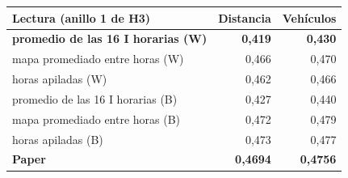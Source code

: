 \begin{tabular}{lrr}\toprule
Lectura (anillo 1 de H3) & Distancia & Vehículos \\\midrule
\textbf{promedio de las 16 I horarias (W)} & \textbf{0,419} & \textbf{0,430} \\
mapa promediado entre horas (W) & 0,466 & 0,470 \\
horas apiladas (W) & 0,462 & 0,466 \\
promedio de las 16 I horarias (B) & 0,427 & 0,440 \\
mapa promediado entre horas (B) & 0,472 & 0,479 \\
horas apiladas (B) & 0,473 & 0,477 \\
\midrule
\textbf{Paper} & \textbf{0,4694} & \textbf{0,4756} \\
\bottomrule\end{tabular}
